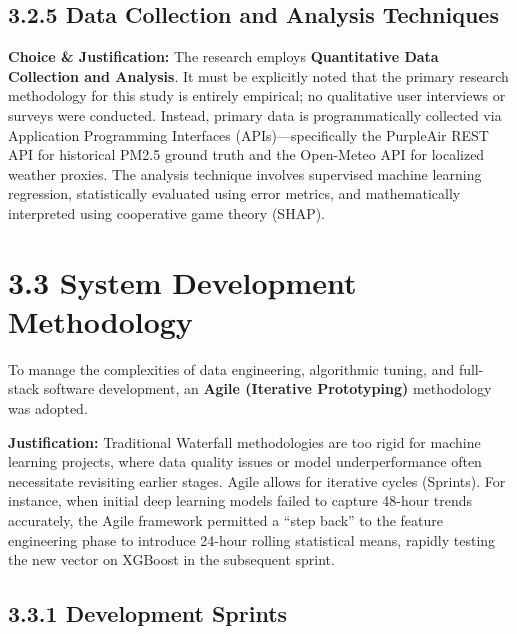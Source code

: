 \subsection{3.2.5 Data Collection and Analysis
Techniques}\label{data-collection-and-analysis-techniques}

\textbf{Choice \& Justification:} The research employs
\textbf{Quantitative Data Collection and Analysis}. It must be
explicitly noted that the primary research methodology for this study is
entirely empirical; no qualitative user interviews or surveys were
conducted. Instead, primary data is programmatically collected via
Application Programming Interfaces (APIs)---specifically the PurpleAir
REST API for historical PM2.5 ground truth and the Open-Meteo API for
localized weather proxies. The analysis technique involves supervised
machine learning regression, statistically evaluated using error
metrics, and mathematically interpreted using cooperative game theory
(SHAP).

\section{3.3 System Development
Methodology}\label{system-development-methodology}

To manage the complexities of data engineering, algorithmic tuning, and
full-stack software development, an \textbf{Agile (Iterative
Prototyping)} methodology was adopted.

\textbf{Justification:} Traditional Waterfall methodologies are too
rigid for machine learning projects, where data quality issues or model
underperformance often necessitate revisiting earlier stages. Agile
allows for iterative cycles (Sprints). For instance, when initial deep
learning models failed to capture 48-hour trends accurately, the Agile
framework permitted a ``step back'' to the feature engineering phase to
introduce 24-hour rolling statistical means, rapidly testing the new
vector on XGBoost in the subsequent sprint.

\subsection{3.3.1 Development Sprints}\label{development-sprints}


